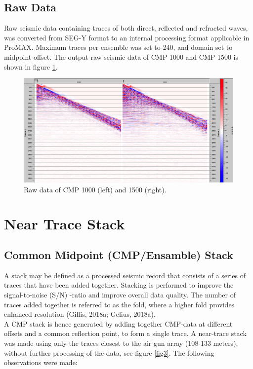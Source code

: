 \documentclass[10pt,a4paper]{article}
\begin{document}
\subsection{Raw Data}

Raw seismic data containing traces of both direct, reflected and refracted waves, was converted from SEG-Y format to an internal processing format applicable in ProMAX. Maximum traces per ensemble was set to 240, and domain set to midpoint-offset. The output raw seismic data of CMP 1000 and CMP 1500 is shown in figure \ref{fig2}.

\begin{figure}[H]
\includegraphics[width=\textwidth]{fig2.jpg}
\caption{Raw data of CMP 1000 (left) and 1500 (right).}
\label{fig2}
\end{figure}

\section{Near Trace Stack}


\subsection{Common Midpoint (CMP/Ensamble) Stack}

A stack may be defined as a processed seismic record that consists of a series of traces that have been added together. Stacking is performed to improve the signal-to-noise (S/N) -ratio and improve overall data quality. The number of traces added together is referred to as the fold, where a higher fold provides enhanced resolution (Gillis, 2018a; Gelius, 2018a).
\\
A CMP stack is hence generated by adding together CMP-data at different offsets and a common reflection point, to form a single trace. A near-trace stack was made using only the traces closest to the air gun array (108-133 meters), without further processing of the data, see figure \ref{fig3}. The following observations were made:
\end{document}
